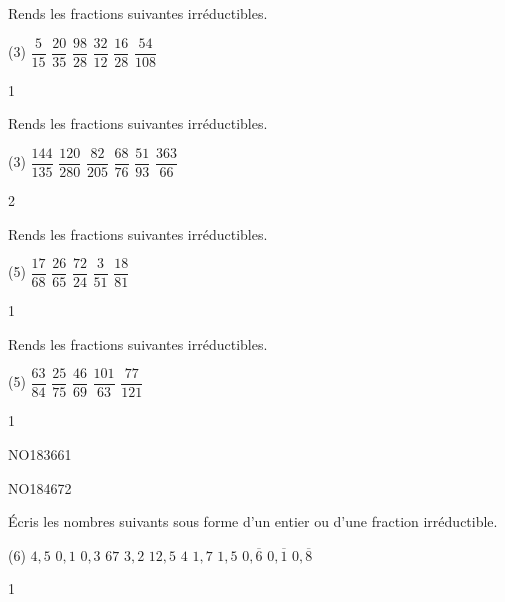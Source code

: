 \documentclass[a4paper,12pt]{report}
\begin{document}
\begin{exop}{
Rends les fractions suivantes irréductibles.
\begin{tasks}[after-item-skip = 0.4em, after-skip=-0.5em](3)
    \task $\dfrac{5}{15}$
    \task $\dfrac{20}{35}$
    \task $\dfrac{98}{28}$
    \task $\dfrac{32}{12}$
    \task $\dfrac{16}{28}$
    \task $\dfrac{54}{108}$
\end{tasks}
}{1}\end{exop}

\begin{exop}{
Rends les fractions suivantes irréductibles.
\begin{tasks}[after-item-skip = 0.4em, after-skip=-0.5em](3)
    \task $\dfrac{144}{135}$
    \task $\dfrac{120}{280}$
    \task $\dfrac{82}{205}$
    \task $\dfrac{68}{76}$
    \task $\dfrac{51}{93}$
    \task $\dfrac{363}{66}$
\end{tasks}
}{2}\end{exop}

\begin{exo}{
Rends les fractions suivantes irréductibles.
\begin{tasks}[after-item-skip = 0.4em, after-skip=-0.5em](5)
\task $\dfrac{17}{68}$
\task $\dfrac{26}{65}$
\task $\dfrac{72}{24}$
\task $\dfrac{3}{51}$
\task $\dfrac{18}{81}$
\end{tasks}
}{1}\end{exo}

\begin{exo}{
Rends les fractions suivantes irréductibles.
\begin{tasks}[after-item-skip = 0.4em, after-skip=-0.5em](5)
\task $\dfrac{63}{84}$
\task $\dfrac{25}{75}$
\task $\dfrac{46}{69}$
\task $\dfrac{101}{63}$
\task $\dfrac{77}{121}$
\end{tasks}
}{1}\end{exo}


\begin{exof}{NO183}{66}{1}
\end{exof}
\begin{exof}{NO184}{67}{2}
\end{exof}

\begin{exo}{
Écris les nombres suivants sous forme d'un entier ou d'une fraction irréductible.
\begin{tasks}(6)
	\task $4,5$
	\task $0,1$
	\task $0,3$
	\task $67$
	\task $3,2$
	\task $12,5$
	\task $4$
	\task $1,7$
	\task $1,5$
	\task $0,\overline{6}$
	\task $0,\overline{1}$
	\task $0,\overline{8}$
\end{tasks}
}{1}\end{exo}
\end{document}
